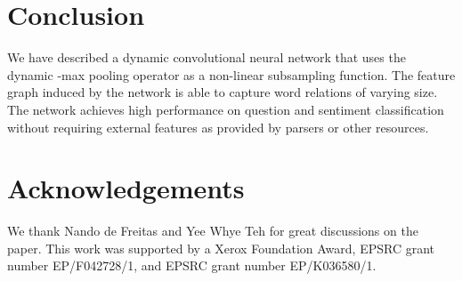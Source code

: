 \documentclass[11pt]{article}
\begin{document}
\vspace{-3pt}
\section{Conclusion}

We have described a dynamic convolutional neural network that uses the dynamic -max pooling operator as a non-linear subsampling function. The feature graph induced by the network  is able to capture word relations of varying size. The network achieves high performance on question and sentiment classification without requiring external features  as provided by parsers or other resources.  






\section*{Acknowledgements}
We thank Nando de Freitas and Yee Whye Teh for great discussions on the paper. This work was supported by a Xerox Foundation Award, EPSRC grant number EP/F042728/1, and EPSRC grant number EP/K036580/1.




\end{document}
